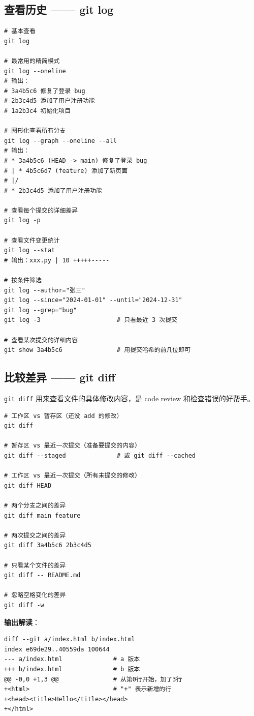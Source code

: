 \documentclass[12pt,a4paper]{article}
\begin{document}
\subsection{查看历史 —— git log}

\begin{lstlisting}
# 基本查看
git log

# 最常用的精简模式
git log --oneline
# 输出：
# 3a4b5c6 修复了登录 bug
# 2b3c4d5 添加了用户注册功能
# 1a2b3c4 初始化项目

# 图形化查看所有分支
git log --graph --oneline --all
# 输出：
# * 3a4b5c6 (HEAD -> main) 修复了登录 bug
# | * 4b5c6d7 (feature) 添加了新页面
# |/
# * 2b3c4d5 添加了用户注册功能

# 查看每个提交的详细差异
git log -p

# 查看文件变更统计
git log --stat
# 输出：xxx.py | 10 +++++-----

# 按条件筛选
git log --author="张三"
git log --since="2024-01-01" --until="2024-12-31"
git log --grep="bug"
git log -3                     # 只看最近 3 次提交

# 查看某次提交的详细内容
git show 3a4b5c6               # 用提交哈希的前几位即可
\end{lstlisting}

\subsection{比较差异 —— git diff}

\texttt{git diff} 用来查看文件的具体修改内容，是 code review 和检查错误的好帮手。

\begin{lstlisting}
# 工作区 vs 暂存区（还没 add 的修改）
git diff

# 暂存区 vs 最近一次提交（准备要提交的内容）
git diff --staged              # 或 git diff --cached

# 工作区 vs 最近一次提交（所有未提交的修改）
git diff HEAD

# 两个分支之间的差异
git diff main feature

# 两次提交之间的差异
git diff 3a4b5c6 2b3c4d5

# 只看某个文件的差异
git diff -- README.md

# 忽略空格变化的差异
git diff -w
\end{lstlisting}

\textbf{输出解读}：
\begin{lstlisting}[numbers=none]
diff --git a/index.html b/index.html
index e69de29..40559da 100644
--- a/index.html              # a 版本
+++ b/index.html              # b 版本
@@ -0,0 +1,3 @@               # 从第0行开始，加了3行
+<html>                       # "+" 表示新增的行
+<head><title>Hello</title></head>
+</html>
\end{lstlisting}
\end{document}
